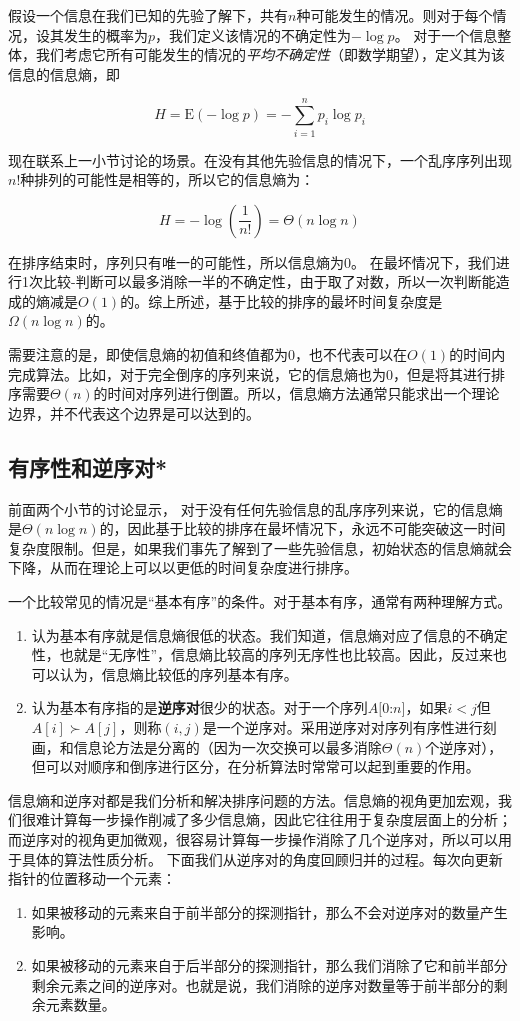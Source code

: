 假设一个信息在我们已知的先验了解下，共有$n$种可能发生的情况。则对于每个情况，设其发生的概率为$p$，我们定义该情况的不确定性为$-\log p$。
对于一个信息整体，我们考虑它所有可能发生的情况的\textit{平均不确定性}（即数学期望），定义其为该信息的信息熵，即

$$
H = \mathrm{E}\left(-\log p\right) = -\sum_{i=1}^n p_i\log p_i
$$

现在联系上一小节讨论的场景。在没有其他先验信息的情况下，一个乱序序列出现$n!$种排列的可能性是相等的，所以它的信息熵为：

$$
H = -\log \left(\frac{1}{n!}\right) = \Theta(n\log n)
$$

在排序结束时，序列只有唯一的可能性，所以信息熵为0。
在最坏情况下，我们进行1次比较-判断可以最多消除一半的不确定性，由于取了对数，所以一次判断能造成的熵减是$O(1)$的。综上所述，基于比较的排序的最坏时间复杂度是$\Omega(n\log n)$的。

需要注意的是，即使信息熵的初值和终值都为0，也不代表可以在$O(1)$的时间内完成算法。比如，对于完全倒序的序列来说，它的信息熵也为0，但是将其进行排序需要$\Theta(n)$的时间对序列进行倒置。所以，信息熵方法通常只能求出一个理论边界，并不代表这个边界是可以达到的。

\subsection{有序性和逆序对*}

前面两个小节的讨论显示，
对于没有任何先验信息的乱序序列来说，它的信息熵是$\Theta(n\log n)$的，因此基于比较的排序在最坏情况下，永远不可能突破这一时间复杂度限制。但是，如果我们事先了解到了一些先验信息，初始状态的信息熵就会下降，从而在理论上可以以更低的时间复杂度进行排序。

一个比较常见的情况是“基本有序”的条件。对于基本有序，通常有两种理解方式。
\begin{enumerate}
    \item 认为基本有序就是信息熵很低的状态。我们知道，信息熵对应了信息的不确定性，也就是“无序性”，信息熵比较高的序列无序性也比较高。因此，反过来也可以认为，信息熵比较低的序列基本有序。
    \item 认为基本有序指的是\textbf{逆序对}很少的状态。对于一个序列$A[0$:$n]$，如果$i<j$但$A[i]\succ A[j]$，则称$(i,j)$是一个逆序对。采用逆序对对序列有序性进行刻画，和信息论方法是分离的（因为一次交换可以最多消除$\Theta(n)$个逆序对），但可以对顺序和倒序进行区分，在分析算法时常常可以起到重要的作用。
\end{enumerate}

信息熵和逆序对都是我们分析和解决排序问题的方法。信息熵的视角更加宏观，我们很难计算每一步操作削减了多少信息熵，因此它往往用于复杂度层面上的分析；而逆序对的视角更加微观，很容易计算每一步操作消除了几个逆序对，所以可以用于具体的算法性质分析。
下面我们从逆序对的角度回顾归并的过程。每次向更新指针的位置移动一个元素：
\begin{enumerate}
    \item 如果被移动的元素来自于前半部分的探测指针，那么不会对逆序对的数量产生影响。
    \item 如果被移动的元素来自于后半部分的探测指针，那么我们消除了它和前半部分剩余元素之间的逆序对。也就是说，我们消除的逆序对数量等于前半部分的剩余元素数量。
\end{enumerate}

